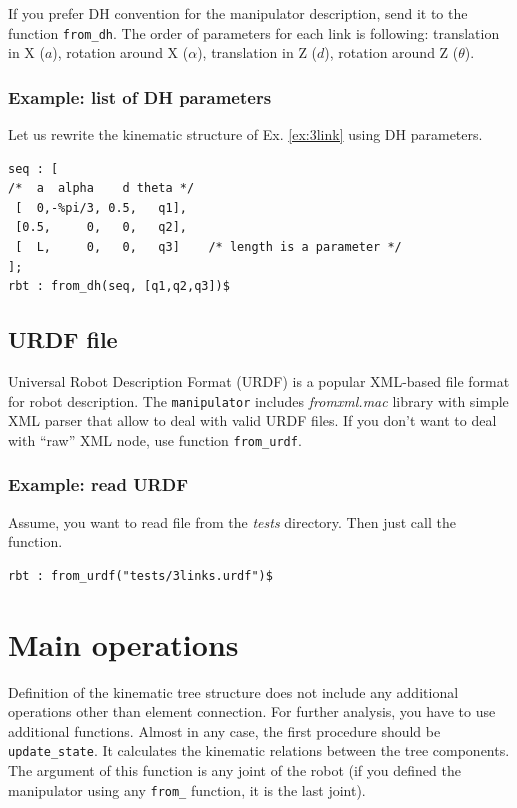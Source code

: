\documentclass{article}
\begin{document}
If you prefer DH convention for the manipulator description, send it to the function \texttt{from\_dh}. The order of parameters for each link is following: translation in X ($a$), rotation around X ($\alpha$), translation in Z ($d$), rotation around Z ($\theta$). 

\subsubsection{Example: list of DH parameters}

Let us rewrite the kinematic structure of Ex. \ref{ex:3link} using DH parameters.

\begin{verbatim}
seq : [
/*  a  alpha    d theta */
 [  0,-%pi/3, 0.5,   q1],   
 [0.5,     0,   0,   q2],  
 [  L,     0,   0,   q3]    /* length is a parameter */
];
rbt : from_dh(seq, [q1,q2,q3])$
\end{verbatim}

\subsection{URDF file}

Universal Robot Description Format (URDF) is a popular XML-based file format for robot description. The \texttt{manipulator} includes \textit{fromxml.mac} library with simple XML parser that allow to deal with valid URDF files. If you don't want to deal with ``raw'' XML node, use function \texttt{from\_urdf}. 

\subsubsection{Example: read URDF}

Assume, you want to read file from the \textit{tests} directory. Then just call the function.
\begin{verbatim}
rbt : from_urdf("tests/3links.urdf")$
\end{verbatim}

\section{Main operations}

Definition of the kinematic tree structure does not include any additional operations other than element connection. For further analysis, you have to use additional functions. Almost in any case, the first procedure should be \texttt{update\_state}. It calculates the kinematic relations between the tree components. The argument of this function is any joint of the robot (if you defined the manipulator using any \texttt{from\_} function, it is the last joint). 
\end{document}
